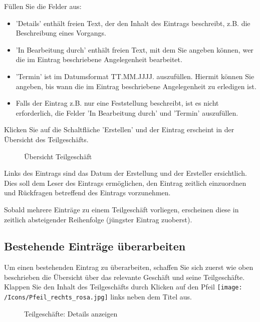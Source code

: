 Füllen Sie die Felder aus:

\begin{itemize}
\item
'Details'  enthält freien Text, der den Inhalt
des Eintrags beschreibt, z.B. die Beschreibung eines Vorgangs.
\item
'In Bearbeitung durch'  enthält freien Text, mit dem Sie angeben können, wer die im Eintrag beschriebene Angelegenheit bearbeitet.
\item
'Termin'  ist im Datumsformat TT.MM.JJJJ. auszufüllen. Hiermit können Sie angeben, bis wann die im Eintrag beschriebene Angelegenheit zu erledigen ist.
\item
Falls der Eintrag z.B. nur eine Feststellung beschreibt, ist es nicht erforderlich, die Felder 'In Bearbeitung durch' und 'Termin' auszufüllen.
\end{itemize}

Klicken Sie auf die Schaltfläche 'Erstellen'  und der Eintrag erscheint in der Übersicht des Teilgeschäfts.

\begin{figure}[H]
\caption{Übersicht Teilgeschäft}
\end{figure}

Links des Eintrags sind das Datum der Erstellung und der Ersteller  ersichtlich. Dies soll dem Leser des Eintrags ermöglichen, den Eintrag zeitlich einzuordnen und Rückfragen betreffend des Eintrags vorzunehmen.

Sobald mehrere Einträge zu einem Teilgeschäft vorliegen, erscheinen diese in zeitlich absteigender Reihenfolge (jüngster Eintrag zuoberst).

\subsection{Bestehende Einträge überarbeiten}

Um einen bestehenden Eintrag zu überarbeiten, schaffen Sie sich zuerst wie oben beschrieben die Übersicht über das relevante Geschäft und seine Teilgeschäfte. Klappen Sie den Inhalt des Teilgeschäfts durch Klicken auf den Pfeil \texttt{[image: /Icons/Pfeil\_rechts\_rosa.jpg]} links neben dem Titel aus.
	
\begin{figure}[H]
\caption{Teilgeschäfte: Details anzeigen}
\end{figure}

